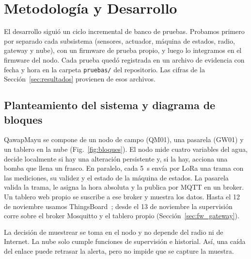 \section{Metodología y Desarrollo}

El desarrollo siguió un ciclo incremental de banco de pruebas. Probamos primero por separado cada subsistema (sensores, actuador, máquina de estados, radio, gateway y nube), con un firmware de prueba propio, y luego lo integramos en el firmware del nodo. Cada prueba quedó registrada en un archivo de evidencia con fecha y hora en la carpeta \texttt{pruebas/} del repositorio. Las cifras de la Sección~\ref{sec:resultados} provienen de esos archivos.

\subsection{Planteamiento del sistema y diagrama de bloques}
\label{sec:bloques}

QawapMayu se compone de un nodo de campo (QM01), una pasarela (GW01) y un tablero en la nube (Fig.~\ref{fig:bloques}). El nodo mide cuatro variables del agua, decide localmente si hay una alteración persistente y, si la hay, acciona una bomba que llena un frasco. En paralelo, cada 5~s envía por LoRa una trama con las mediciones, su validez y el estado de la máquina de estados. La pasarela valida la trama, le asigna la hora absoluta y la publica por MQTT en un broker. Un tablero web propio se suscribe a ese broker y muestra los datos. Hasta el 12 de noviembre usamos ThingsBoard~\cite{thingsboard}; desde el 13 de noviembre la supervisión corre sobre el broker Mosquitto y el tablero propio (Sección~\ref{sec:fw_gateway}).

La decisión de muestrear se toma en el nodo y no depende del radio ni de Internet. La nube solo cumple funciones de supervisión e historial. Así, una caída del enlace puede retrasar la alerta, pero no impide que se capture la muestra.

